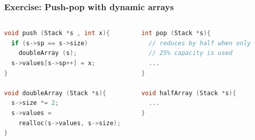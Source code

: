 \documentclass[aspectratio=169]{beamer}
\begin{document}
\begin{frame}[fragile]\frametitle{Exercise: Push-pop with dynamic arrays}
    

\begin{columns}
\begin{column}{.48\textwidth}
\begin{lstlisting}[language=C++, emph={push,pop,doubleArray,realloc}]
void push (Stack *s , int x){
  if (s->sp == s->size)
    doubleArray (s);
  s->values[s->sp++] = x;
}

void doubleArray (Stack *s){
  s->size *= 2;
  s->values =
    realloc(s->values, s->size);
}
\end{lstlisting}
%
\end{column}
\begin{column}{.50\textwidth}
%
\begin{lstlisting}[language=C++, emph={push,pop,doubleArray,realloc}]
int pop (Stack *s){
  // reduces by half when only
  // 25% capacity is used
  ...
}

void halfArray (Stack *s){
  ...
}
\end{lstlisting}
%
\end{column}
\end{columns}


\end{frame}
\end{document}

